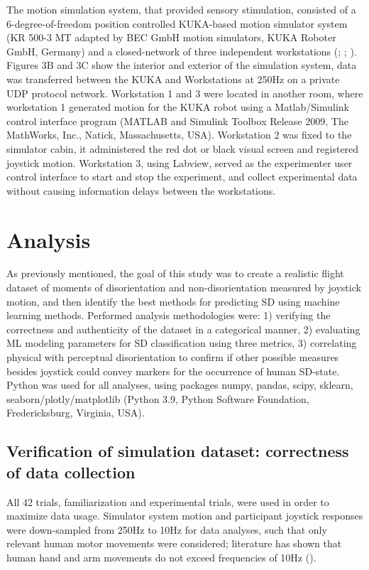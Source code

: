 \documentclass[11pt, onecolumn]{article}
\begin{document}
The motion simulation system, that provided sensory stimulation, consisted of a 6-degree-of-freedom position controlled KUKA-based motion simulator system (KR 500-3 MT adapted by BEC GmbH motion simulators, KUKA Roboter GmbH, Germany) and a closed-network of three independent workstations (\cite{Denquin_2021_LAF}; \cite{Landrieu_2017_Timetocollision}; \cite{Bellmann_2011_DLR}).  Figures 3B and 3C show the interior and exterior of the simulation system, data was transferred between the KUKA and Workstations at 250Hz on a private UDP protocol network.  Workstation 1 and 3 were located in another room, where workstation 1 generated motion for the KUKA robot using a Matlab/Simulink control interface program (MATLAB and Simulink Toolbox Release 2009, The MathWorks, Inc., Natick, Massachusetts, USA).  Workstation 2 was fixed to the simulator cabin, it administered the red dot or black visual screen and registered joystick motion.  Workstation 3, using Labview, served as the experimenter user control interface to start and stop the experiment, and collect experimental data without causing information delays between the workstations.



\section{Analysis}
As previously mentioned, the goal of this study was to create a realistic flight dataset of moments of disorientation and non-disorientation measured by joystick motion, and then identify the best methods for predicting SD using machine learning methods.  Performed analysis methodologies were: 1) verifying the correctness and authenticity of the dataset in a categorical manner, 2) evaluating ML modeling parameters for SD classification using three metrics, 3) correlating physical with perceptual disorientation to confirm if other possible measures besides joystick could convey markers for the occurrence of human SD-state.  Python was used for all analyses, using packages numpy, pandas, scipy, sklearn, seaborn/plotly/matplotlib  (Python 3.9, Python Software Foundation, Fredericksburg, Virginia, USA). 

\subsection{Verification of simulation dataset: correctness of data collection}
All 42 trials, familiarization and experimental trials, were used in order to maximize data usage.  Simulator system motion and participant joystick responses were down-sampled from 250Hz to 10Hz for data analyses, such that only relevant human motor movements were considered; literature has shown that human hand and arm movements do not exceed frequencies of 10Hz (\cite{Shadmehr_2004_Computational}).
\end{document}
